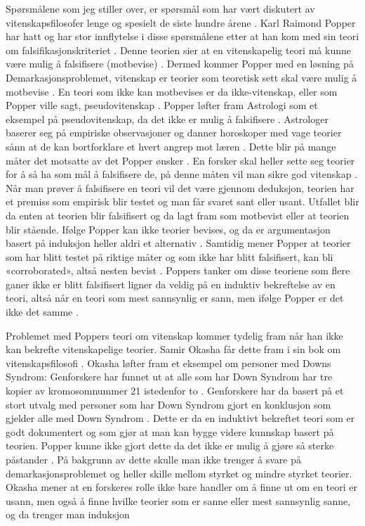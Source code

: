 \documentclass[
]{book}
\begin{document}
Spørsmålene som jeg stiller over, er spørsmål som har vært diskutert av
vitenskapsfilosofer lenge og spesielt de siste hundre årene
\citep{okasha2016} . Karl Raimond Popper har hatt og har stor innflytelse i
disse spørsmålene etter at han kom med sin teori om
falsifikasjonskriteriet \citep{okasha2016} . Denne teorien sier at en
vitenskapelig teori må kunne være mulig å falsifisere (motbevise)
\citep{popper2002}. Dermed kommer Popper med en løsning på
Demarkasjonsproblemet, vitenskap er teorier som teoretisk sett skal være
mulig å motbevise \citep{popper2002}. En teori som ikke kan motbevises er da
ikke-vitenskap, eller som Popper ville sagt, pseudovitenskap
\citep{popper2002}. Popper løfter fram Astrologi som et eksempel på
pseudovitenskap, da det ikke er mulig å falsifisere \citep{popper2002}.
Astrologer baserer seg på empiriske observasjoner og danner horoskoper
med vage teorier sånn at de kan bortforklare et hvert angrep mot læren
\citep{popper2002}. Dette blir på mange måter det motsatte av det Popper
ønsker \citep{popper2002}. En forsker skal heller sette seg teorier for å så
ha som mål å falsifisere de, på denne måten vil man sikre god vitenskap
\citep{popper2002}. Når man prøver å falsifisere en teori vil det være
gjennom deduksjon, teorien har et premiss som empirisk blir testet og
man får svaret sant eller usant. Utfallet blir da enten at teorien blir
falsifisert og da lagt fram som motbevist eller at teorien blir stående.
Ifølge Popper kan ikke teorier bevises, og da er argumentasjon basert på
induksjon heller aldri et alternativ \citep{okasha2016}. Samtidig mener
Popper at teorier som har blitt testet på riktige måter og som ikke har
blitt falsifisert, kan bli «corroborated», altså nesten bevist
\citep{popper2002}. Poppers tanker om disse teoriene som flere ganer ikke er
blitt falsifisert ligner da veldig på en induktiv bekreftelse av en
teori, altså når en teori som mest sannsynlig er sann, men ifølge Popper
er det ikke det samme \citep{okasha2016, popper2002}.

Problemet med Poppers teori om vitenskap kommer tydelig fram når han
ikke kan bekrefte vitenskapelige teorier. Samir Okasha får dette fram i
sin bok om vitenskapsfilosofi \citep{okasha2016}. Okasha løfter fram et
eksempel om personer med Downs Syndrom: Genforskere har funnet ut at
alle som har Down Syndrom har tre kopier av kromosomnummer 21 istedenfor
to \citep[s. 18]{okasha2016}. Genforskere har da basert på et stort utvalg
med personer som har Down Syndrom gjort en konklusjon som gjelder alle
med Down Syndrom \citep{okasha2016}. Dette er da en induktivt bekreftet teori
som er godt dokumentert og som gjør at man kan bygge videre kunnskap
basert på teorien. Popper kunne ikke gjort dette da det ikke er mulig å
gjøre så sterke påstander \citep{okasha2016}. På bakgrunn av dette skulle man
ikke trenger å svare på demarkasjonsproblemet og heller skille mellom
styrket og mindre styrket teorier. Okasha mener at en forskeres rolle
ikke bare handler om å finne ut om en teori er usann, men også å finne
hvilke teorier som er sanne eller mest sannsynlig sanne, og da trenger
man induksjon \citep[s. 19--20]{okasha2016}
\end{document}
